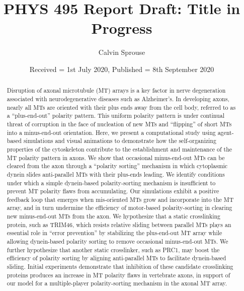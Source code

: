 \documentclass[]{biophysicist}
\title[PHYS 495 Report Draft]{PHYS 495 Report Draft: Title in Progress}
\author{Calvin Sprouse}{cwu}
\affiliation{cwu}{Central Washington Universtiy Department of Physics, Ellensburg, Washington, 98926}
\date[2019]{Received = 1st July 2020, Published = 8th September 2020}
\begin{document}
\begin{abstract}
Disruption of axonal microtubule (MT) arrays is a key factor in nerve degeneration associated with neurodegenerative diseases such as Alzheimer's. In developing axons, nearly all MTs are oriented with their plus ends away from the cell body, referred to as a “plus-end-out” polarity pattern. This uniform polarity pattern is under continual threat of corruption in the face of nucleation of new MTs and “flipping” of short MTs into a minus-end-out orientation. Here, we present a computational study using agent-based simulations and visual animations to demonstrate how the self-organizing properties of the cytoskeleton contribute to the establishment and maintenance of the MT polarity pattern in axons. We show that occasional minus-end-out MTs can be cleared from the axon through a “polarity sorting” mechanism in which cytoplasmic dynein slides anti-parallel MTs with their plus-ends leading. We identify conditions under which a simple dynein-based polarity-sorting mechanism is insufficient to prevent MT polarity flaws from accumulating. Our simulations exhibit a positive feedback loop that emerges when mis-oriented MTs grow and incorporate into the MT array, and in turn undermine the efficiency of motor-based polarity-sorting in clearing new minus-end-out MTs from the axon. We hypothesize that a static crosslinking protein, such as TRIM46, which resists relative sliding between parallel MTs plays an essential role in “error prevention” by stabilizing the plus-end-out MT array while allowing dynein-based polarity sorting to remove occasional minus-end-out MTs. We further hypothesize that another static crosslinker, such as PRC1, may boost the efficiency of polarity sorting by aligning anti-parallel MTs to facilitate dynein-based sliding. Initial experiments demonstrate that inhibition of these candidate crosslinking proteins produces an increase in MT polarity flaws in vertebrate axons, in support of our model for a multiple-player polarity-sorting mechanism in the axonal MT array.
\end{abstract}


\maketitle

\end{document}
